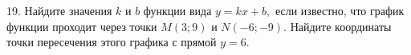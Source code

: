 19. Найдите значения $k$ и $b$ функции вида $y=kx+b,$ если известно, что график функции проходит через точки $M(3;9)$ и $N(-6;-9).$ Найдите координаты точки пересечения этого графика с прямой $y=6.$\\
